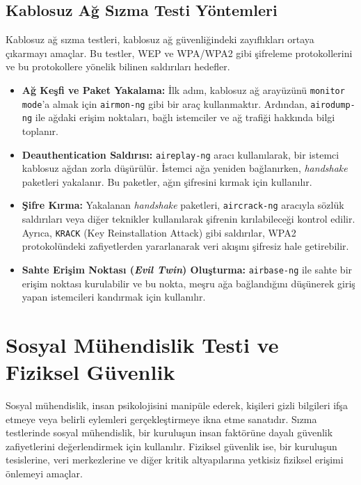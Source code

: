 \subsection{Kablosuz Ağ Sızma Testi Yöntemleri}

Kablosuz ağ sızma testleri, kablosuz ağ güvenliğindeki zayıflıkları ortaya çıkarmayı amaçlar. Bu testler, WEP ve WPA/WPA2 gibi şifreleme protokollerini ve bu protokollere yönelik bilinen saldırıları hedefler.

\begin{itemize}
\item \textbf{Ağ Keşfi ve Paket Yakalama:} İlk adım, kablosuz ağ arayüzünü \texttt{monitor mode}'a almak için \texttt{airmon-ng} gibi bir araç kullanmaktır. Ardından, \texttt{airodump-ng} ile ağdaki erişim noktaları, bağlı istemciler ve ağ trafiği hakkında bilgi toplanır.
\item \textbf{Deauthentication Saldırısı:} \texttt{aireplay-ng} aracı kullanılarak, bir istemci kablosuz ağdan zorla düşürülür. İstemci ağa yeniden bağlanırken, \textit{handshake} paketleri yakalanır. Bu paketler, ağın şifresini kırmak için kullanılır.
\item \textbf{Şifre Kırma:} Yakalanan \textit{handshake} paketleri, \texttt{aircrack-ng} aracıyla sözlük saldırıları veya diğer teknikler kullanılarak şifrenin kırılabileceği kontrol edilir. Ayrıca, \texttt{KRACK} (Key Reinstallation Attack) gibi saldırılar, WPA2 protokolündeki zafiyetlerden yararlanarak veri akışını şifresiz hale getirebilir.
\item \textbf{Sahte Erişim Noktası (\textit{Evil Twin}) Oluşturma:} \texttt{airbase-ng} ile sahte bir erişim noktası kurulabilir ve bu nokta, meşru ağa bağlandığını düşünerek giriş yapan istemcileri kandırmak için kullanılır.
\end{itemize}

\section{Sosyal Mühendislik Testi ve Fiziksel Güvenlik}

Sosyal mühendislik, insan psikolojisini manipüle ederek, kişileri gizli bilgileri ifşa etmeye veya belirli eylemleri gerçekleştirmeye ikna etme sanatıdır. Sızma testlerinde sosyal mühendislik, bir kuruluşun insan faktörüne dayalı güvenlik zafiyetlerini değerlendirmek için kullanılır. Fiziksel güvenlik ise, bir kuruluşun tesislerine, veri merkezlerine ve diğer kritik altyapılarına yetkisiz fiziksel erişimi önlemeyi amaçlar.

